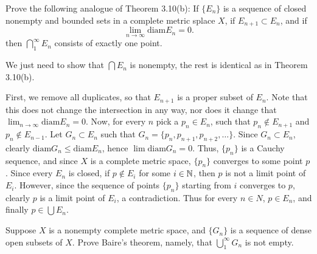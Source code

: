 \begin{problem}
  Prove the following analogue of Theorem 3.10(b): If $\{E_n\}$ is a sequence of closed nonempty and bounded sets in a complete metric splace $X$, if $E_{n+1} \subset E_n$, and if 
  \[\lim_{n \to \infty} \text{diam} E_n = 0.\]
  then $\bigcap_1^{\infty} E_n$ consists of exactly one point.
\end{problem}

\begin{solution}
  We just need to show that $\bigcap E_n$ is nonempty, the rest is identical as in Theorem 3.10(b).

  First, we remove all duplicates, so that $E_{n + 1}$ is a proper subset of $E_n$.
  Note that this does not change the intersection in any way, nor does it change that $\lim_{n \to \infty} \text{diam} E_n = 0$.
  Now, for every $n$ pick a $p_n \in E_n$, such that $p_n \notin E_{n + 1}$ and $p_n \notin E_{n - 1}$.
  Let $G_n \subset E_n$ such that $G_n = \{p_n, p_{n + 1}, p_{n + 2}, \ldots\}$.
  Since $G_n \subset E_n$, clearly $\text{diam} G_n \le \text{diam} E_n$, hence $\lim \text{diam} G_n = 0$.
  Thus, $\{p_n\}$ is a Cauchy sequence, and since $X$ is a complete metric space, $\{p_n\}$ converges to some point $p$.
  Since every $E_n$ is closed, if $p \notin E_i$ for some $i \in \mathbb{N}$, then $p$ is not a limit point of $E_i$.
  However, since the sequence of points $\{p_n\}$ starting from $i$ converges to $p$, clearly $p$ is a limit point of $E_i$, a contradiction.
  Thus for every $n \in N$, $p \in E_n$, and finally $p \in \bigcup E_n$.
\end{solution}

\begin{problem}
  Suppose $X$ is a nonempty complete metric space, and $\{G_n\}$ is a sequence of dense open subsets of $X$.
  Prove Baire's theorem, namely, that $\bigcup_1^{\infty} G_n$ is not empty.
\end{problem}

